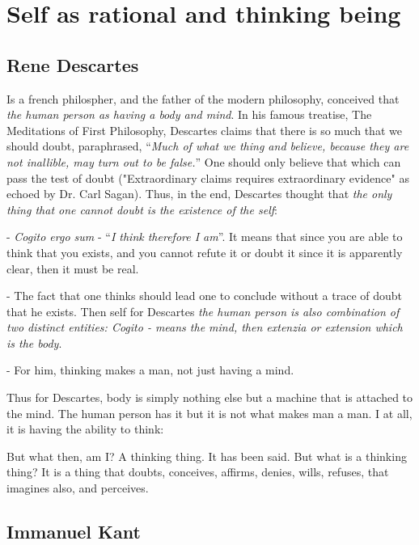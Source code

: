 \documentclass[12pt, UTF8]{article}
\begin{document}
	\section{Self as rational and thinking being}
	
	\subsection*{Rene Descartes}
	
	Is a french philospher, and the father of the modern philosophy, conceived that \emph{the human person as having a body and mind}. In his famous treatise, The Meditations of First Philosophy, Descartes claims that there is so much that we should doubt, paraphrased, ``\textit{Much of what we thing and believe, because they are not inallible, may turn out to be false.}'' One should only believe that which can pass the test of doubt ("Extraordinary claims requires extraordinary evidence" as echoed by Dr. Carl Sagan). Thus, in the end, Descartes thought that \textit{the only thing that one cannot doubt is the existence of the self}:
	
	- \emph{Cogito ergo sum} - ``\textit{I think therefore I am}''. It means that since you are able to think that you exists, and you cannot refute it or doubt it since it is apparently clear, then it must be real.
	
	- The fact that one thinks should lead one to conclude without a trace of doubt that he exists. Then self for Descartes \emph{the human person is also combination of two distinct entities: Cogito - means the mind, then extenzia or extension which is the body}.
	
	- For him, thinking makes a man, not just having a mind.
	
	Thus for Descartes, body is simply nothing else but a machine that is attached to the mind. The human person has it but it is not what makes man a man. I at all, it is having the ability to think:
	
	\begin{displayquote}
		But what then, am I? A thinking thing. It has been said. But what is a thinking thing? It is a thing that doubts, conceives, affirms, denies, wills, refuses, that imagines also, and perceives.
	\end{displayquote}
	
	\subsection*{Immanuel Kant}
	
\end{document}
